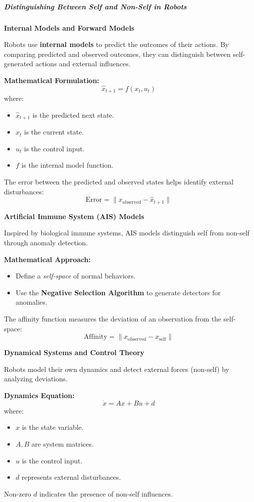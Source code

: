 \documentclass{book}
\providecommand{\ProjectDeepHeading}[2]{%
    \par\medskip\noindent\textbf{#2}\par\smallskip
}
\begin{document}
\subparagraph{Distinguishing Between Self and Non-Self in Robots}

\ProjectDeepHeading{1}{Internal Models and Forward Models}
Robots use \textbf{internal models} to predict the outcomes of their actions. By comparing predicted and observed outcomes, they can distinguish between self-generated actions and external influences.

\textbf{Mathematical Formulation:}
\begin{equation}
    \hat{x}_{t+1} = f(x_t, u_t)
\end{equation}
where:
\begin{itemize}
    \item \( \hat{x}_{t+1} \) is the predicted next state.
    \item \( x_t \) is the current state.
    \item \( u_t \) is the control input.
    \item \( f \) is the internal model function.
\end{itemize}
The error between the predicted and observed states helps identify external disturbances:
\begin{equation}
    \text{Error} = \| x_{\text{observed}} - \hat{x}_{t+1} \|
\end{equation}

\ProjectDeepHeading{1}{Artificial Immune System (AIS) Models}
Inspired by biological immune systems, AIS models distinguish self from non-self through anomaly detection.

\textbf{Mathematical Approach:}
\begin{itemize}
    \item Define a \textit{self-space} of normal behaviors.
    \item Use the \textbf{Negative Selection Algorithm} to generate detectors for anomalies.
\end{itemize}

The affinity function measures the deviation of an observation from the self-space:
\begin{equation}
    \text{Affinity} = \| x_{\text{observed}} - x_{\text{self}} \|
\end{equation}

\ProjectDeepHeading{1}{Dynamical Systems and Control Theory}
Robots model their own dynamics and detect external forces (non-self) by analyzing deviations.

\textbf{Dynamics Equation:}
\begin{equation}
    \dot{x} = Ax + Bu + d
\end{equation}
where:
\begin{itemize}
    \item \( x \) is the state variable.
    \item \( A, B \) are system matrices.
    \item \( u \) is the control input.
    \item \( d \) represents external disturbances.
\end{itemize}
Non-zero \( d \) indicates the presence of non-self influences.
\end{document}

